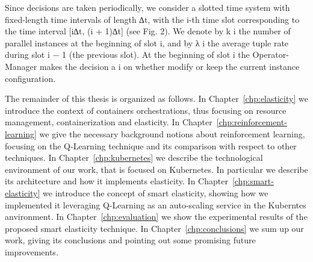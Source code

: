 Since decisions are taken periodically, we consider a slotted time system with
fixed-length time intervals of length ∆t, with the i-th time slot corresponding
to the time interval [i∆t, (i + 1)∆t] (see Fig. 2). We denote by k i the number
of parallel instances at the beginning of slot i, and by λ i the average tuple rate
during slot i − 1 (the previous slot). At the beginning of slot i the Operator-
Manager makes the decision a i on whether modify or keep the current instance
configuration.


The remainder of this thesis is organized as follows.
%
In Chapter~\ref{chp:elasticity} we introduce the context of containers orchestrations, thus focusing on resource management, containerization and elasticity.
%
In Chapter~\ref{chp:reinforcement-learning} we give the necessary background notions about reinforcement learning, focusing on the Q-Learning technique and its comparison with respect to other techniques.
%
In Chapter~\ref{chp:kubernetes} we describe the technological environment of our work, that is focused on Kubernetes. In particular we describe its architecture and how it implements elasticity.
%
In Chapter~\ref{chp:smart-elasticity} we introduce the concept of smart elasticity, showing how we implemented it leveraging Q-Learning as an auto-scaling service in the Kuberntes anvironment.
%
In Chapter~\ref{chp:evaluation} we show the experimental results of the proposed smart elasticity technique.
%
In Chapter~\ref{chp:conclusions} we sum up our work, giving its conclusions and pointing out some promising future improvements.

